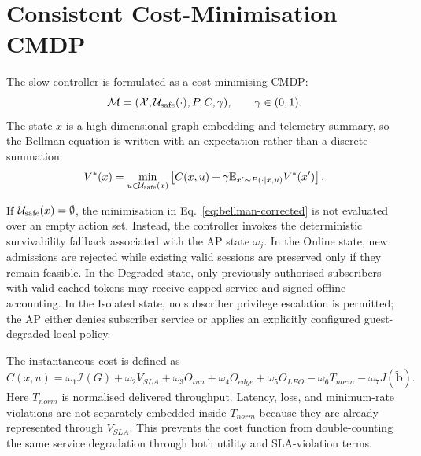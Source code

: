 \section{Consistent Cost-Minimisation CMDP}
\label{sec:cmdp}

The slow controller is formulated as a cost-minimising CMDP:
\begin{equation}
  \mathcal{M}
  =
  (\mathcal{X},\mathcal{U}_{\mathrm{safe}}(\cdot),P,C,\gamma),
  \qquad
  \gamma\in(0,1).
  \label{eq:cmdp}
\end{equation}
The state $x$ is a high-dimensional graph-embedding and telemetry summary, so the
Bellman equation is written with an expectation rather than a discrete summation:
\begin{equation}
  V^*(x)
  =
  \min_{u\in\mathcal{U}_{\mathrm{safe}}(x)}
  \left[
  C(x,u)
  +\gamma
  \mathbb{E}_{x'\sim P(\cdot|x,u)}
  V^*(x')
  \right].
  \label{eq:bellman-corrected}
\end{equation}

If $\mathcal{U}_{\mathrm{safe}}(x)=\emptyset$, the minimisation in Eq.~\eqref{eq:bellman-corrected}
is not evaluated over an empty action set. Instead, the controller invokes the
deterministic survivability fallback associated with the AP state $\omega_j$. In the
Online state, new admissions are rejected while existing valid sessions are preserved
only if they remain feasible. In the Degraded state, only previously authorised
subscribers with valid cached tokens may receive capped service and signed offline
accounting. In the Isolated state, no subscriber privilege escalation is permitted; the
AP either denies subscriber service or applies an explicitly configured guest-degraded
local policy.

The instantaneous cost is defined as
\begin{equation}
  C(x,u)
  =
  \omega_1\mathcal{I}(G)
  +\omega_2V_{SLA}
  +\omega_3O_{tun}
  +\omega_4O_{edge}
  +\omega_5O_{LEO}
  -\omega_6T_{norm}
  -\omega_7J(\tilde{\mathbf{b}}).
  \label{eq:cost-function}
\end{equation}
Here $T_{norm}$ is normalised delivered throughput. Latency, loss, and minimum-rate
violations are not separately embedded inside $T_{norm}$ because they are already
represented through $V_{SLA}$. This prevents the cost function from double-counting
the same service degradation through both utility and SLA-violation terms.

